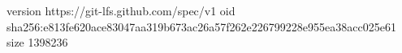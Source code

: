 version https://git-lfs.github.com/spec/v1
oid sha256:e813fe620ace83047aa319b673ac26a57f262e226799228e955ea38acc025e61
size 1398236
